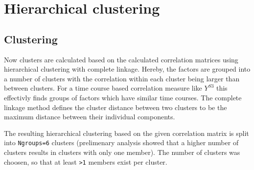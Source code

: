\documentclass[]{article}
\begin{document}
\section{Hierarchical clustering}\label{hierarchical-clustering}

\subsection{Clustering}\label{clustering}

Now clusters are calculated based on the calculated correlation matrices
using hierarchical clustering with complete linkage. Hereby, the factors
are grouped into a number of clusters with the correlation within each
cluster being larger than between clusters. For a time course based
correlation measure like \(Y^{S3}\) this effectivly finds groups of
factors which have similar time courses. The complete linkage method
defines the cluster distance between two clusters to be the maximum
distance between their individual components.

The resulting hierarchical clustering based on the given correlation
matrix is split into \texttt{Ngroups=6} clusters (prelimenary analysis
showed that a higher number of clusters results in clusters with only
one member). The number of clusters was choosen, so that at least
\texttt{\textgreater{}1} members exist per cluster.
\end{document}
